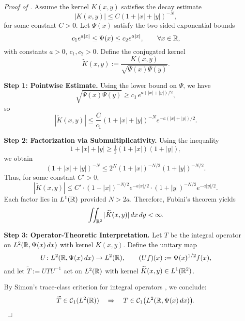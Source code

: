 \begin{proof}[Proof of ]
Assume the kernel \( K(x,y) \) satisfies the decay estimate
\[
|K(x,y)| \le C (1 + |x| + |y|)^{-N},
\]
for some constant \( C > 0 \). Let \( \Psi(x) \) satisfy the two-sided exponential bounds
\[
c_1 e^{a|x|} \le \Psi(x) \le c_2 e^{a|x|}, \qquad \forall x \in \mathbb{R},
\]
with constants \( a > 0 \), \( c_1, c_2 > 0 \). Define the conjugated kernel
\[
\widetilde{K}(x,y) := \frac{K(x,y)}{\sqrt{\Psi(x)\Psi(y)}}.
\]

\medskip
\noindent\textbf{Step 1: Pointwise Estimate.}
Using the lower bound on \( \Psi \), we have
\[
\sqrt{\Psi(x)\Psi(y)} \ge c_1\, e^{a(|x| + |y|)/2},
\]
so
\[
|\widetilde{K}(x,y)| \le \frac{C}{c_1} (1 + |x| + |y|)^{-N} e^{-a(|x| + |y|)/2}.
\]

\medskip
\noindent\textbf{Step 2: Factorization via Submultiplicativity.}
Using the inequality
\[
1 + |x| + |y| \ge \tfrac{1}{2}(1 + |x|)(1 + |y|),
\]
we obtain
\[
(1 + |x| + |y|)^{-N} \le 2^N (1 + |x|)^{-N/2} (1 + |y|)^{-N/2}.
\]
Thus, for some constant \( C' > 0 \),
\[
|\widetilde{K}(x,y)| \le C' \cdot (1 + |x|)^{-N/2} e^{-a|x|/2} \cdot (1 + |y|)^{-N/2} e^{-a|y|/2}.
\]
Each factor lies in \( L^1(\mathbb{R}) \) provided \( N > 2a \). Therefore, Fubini’s theorem yields
\[
\iint_{\mathbb{R}^2} |\widetilde{K}(x,y)|\, dx\,dy < \infty.
\]

\medskip
\noindent\textbf{Step 3: Operator-Theoretic Interpretation.}
Let \( T \) be the integral operator on \( L^2(\mathbb{R}, \Psi(x)\,dx) \) with kernel \( K(x,y) \). Define the unitary map
\[
U \colon L^2(\mathbb{R}, \Psi(x)\,dx) \to L^2(\mathbb{R}), \qquad (Uf)(x) := \Psi(x)^{1/2} f(x),
\]
and let \( \widetilde{T} := U T U^{-1} \) act on \( L^2(\mathbb{R}) \) with kernel \( \widetilde{K}(x,y) \in L^1(\mathbb{R}^2) \).

By Simon’s trace-class criterion for integral operators \cite[Thm.~4.2]{Simon2005TraceIdeals}, we conclude:
\[
\widetilde{T} \in \mathcal{C}_1(L^2(\mathbb{R})) \quad \Rightarrow \quad T \in \mathcal{C}_1\big(L^2(\mathbb{R}, \Psi(x)\,dx)\big).
\]
\end{proof}
